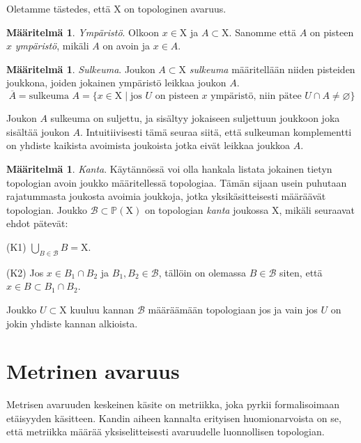 \documentclass[12pt,a4paper,leqno]{report}
\newcommand{\X}{\mathrm{X}}
\newcommand{\Pow}{\mathbb{P}}
\newcommand{\B}{\mathcal{B}}
\theoremstyle{plain}
\theoremstyle{definition}
\newtheorem{maar}[equation]{Määritelmä}
\theoremstyle{remark}
\begin{document}
Oletamme tästedes, että $\X$ on topologinen avaruus.

\begin{maar}\label{ymp}
\emph{Ympäristö}. Olkoon $x \in \X$ ja $A \subset \X$. Sanomme että $A$ on pisteen $x$ \emph{ympäristö}, mikäli $A$ on avoin ja $x \in A$.
\end{maar}

\begin{maar}\label{sulk}
\emph{Sulkeuma}. Joukon $A \subset \X$ \emph{sulkeuma} määritellään niiden pisteiden joukkona, joiden jokainen ympäristö leikkaa joukon $A$.
\begin{equation}
\overline{A} = \text{sulkeuma }A = \{ x \in \X \mid \text{jos } U \text{ on pisteen } x \text{ ympäristö, niin pätee } U \cap A \not= \varnothing \}
\end{equation}
\end{maar}

Joukon $A$ sulkeuma on suljettu, ja sisältyy jokaiseen suljettuun joukkoon joka sisältää joukon $A$. Intuitiivisesti tämä seuraa siitä, että sulkeuman komplementti on yhdiste kaikista avoimista joukoista jotka eivät leikkaa joukkoa $A$.

\begin{maar}\label{kantamaar}
\emph{Kanta}. Käytännössä voi olla hankala listata jokainen tietyn topologian avoin joukko määritellessä topologiaa. Tämän sijaan usein puhutaan rajatummasta joukosta avoimia joukkoja, jotka yksikäsitteisesti määräävät topologian. Joukko $\B \subset \Pow(\X)$ on topologian \emph{kanta} joukossa $\X$, mikäli seuraavat ehdot pätevät:

(K1) $\bigcup_{B \in \B} B = \X$.

(K2) Jos $x \in B_1 \cap B_2$ ja $B_1,B_2\in \B$, tällöin on olemassa $B \in \B$ siten, että $x \in B \subset B_1 \cap B_2$.
\end{maar}

Joukko $U \subset \X$ kuuluu kannan $\B$ määräämään topologiaan jos ja vain jos $U$ on jokin yhdiste kannan alkioista.

\chapter{Metrinen avaruus}\label{MET}

Metrisen avaruuden keskeinen käsite on metriikka, joka pyrkii formalisoimaan etäisyyden käsitteen. Kandin aiheen kannalta erityisen huomionarvoista on se, että metriikka määrää yksiselitteisesti avaruudelle luonnollisen topologian.
\end{document}
